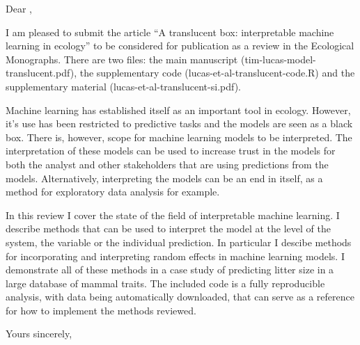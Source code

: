 \documentclass[10pt, a4paper]{letter} %
\begin{document}

\begin{letter}{

}


\opening{Dear ,}



I am pleased to submit the article ``A translucent box: interpretable machine learning in ecology'' to be considered for publication as a review in the Ecological Monographs.
There are two files: the main manuscript (tim-lucas-model-translucent.pdf), the supplementary code (lucas-et-al-translucent-code.R) and the supplementary material (lucas-et-al-translucent-si.pdf).

Machine learning has established itself as an important tool in ecology.
However, it's use has been restricted to predictive tasks and the models are seen as a black box.
There is, however, scope for machine learning models to be interpreted.
The interpretation of these models can be used to increase trust in the models for both the analyst and other stakeholders that are using predictions from the models.
Alternatively, interpreting the models can be an end in itself, as a method for exploratory data analysis for example.

In this review I cover the state of the field of interpretable machine learning.
I describe methods that can be used to interpret the model at the level of the system, the variable or the individual prediction.
In particular I descibe methods for incorporating and interpreting random effects in machine learning models.
I demonstrate all of these methods in a case study of predicting litter size in a large database of mammal traits.
The included code is a fully reproducible analysis, with data being automatically downloaded, that can serve as a reference for how to implement the methods reviewed.



\closing{Yours sincerely,}




\end{letter}
\end{document}
